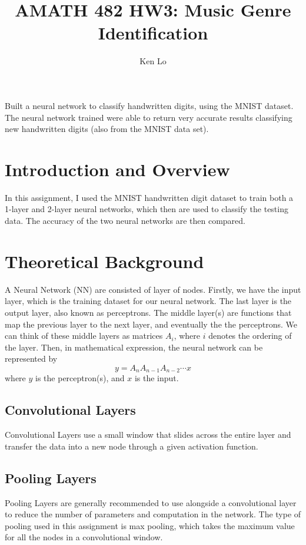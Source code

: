 \documentclass[12pt, a4paper]{article}
\begin{document}
\author{Ken Lo}
\title{AMATH 482 HW3: Music Genre Identification}
\maketitle

\abstract
Built a neural network to classify handwritten digits, using the MNIST dataset. The neural network trained were able to return very accurate results classifying new handwritten digits (also from the MNIST data set).


\section{Introduction and Overview}
In this assignment, I used the MNIST handwritten digit dataset to train both a 1-layer and 2-layer neural networks, which then are used to classify the testing data. The accuracy of the two neural networks are then compared.

\section{Theoretical Background}
A Neural Network (NN) are consisted of layer of nodes. Firstly, we have the input layer, which is the training dataset for our neural network. The last layer is the output layer, also known as perceptrons. The middle layer(s) are functions that map the previous layer to the next layer, and eventually the the perceptrons. We can think of these middle layers as matrices $A_i$, where $i$ denotes the ordering of the layer. Then, in mathematical expression, the neural network can be represented by 
$$y = A_nA_{n-1}A_{n-2}\cdots x$$
where $y$ is the perceptron(s), and $x$ is the input.
\subsection{Convolutional Layers}
Convolutional Layers use a small window that slides across the entire layer and transfer the data into a new node through a given activation function.

\subsection{Pooling Layers}
Pooling Layers are generally recommended to use alongside a convolutional layer to reduce the number of parameters and computation in the network. The type of pooling used in this assignment is max pooling, which takes the maximum value for all the nodes in a convolutional window.
\end{document}
